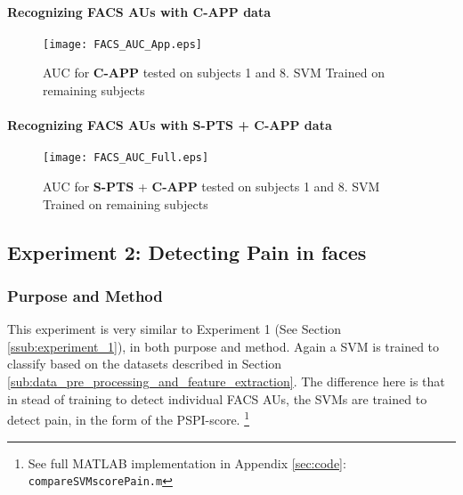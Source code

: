 \documentclass[Main]{subfiles}
\begin{document}

			\paragraph{Recognizing FACS AUs with \textbf{C-APP} data} %
				\label{par:recognizing_facs_aus_with_c_app_data}
				\vspace{-2mm} 
				\begin{figure}[H]
					\begin{center}
						\texttt{[image: FACS\_AUC\_App.eps]}
					\end{center}
					\caption{
						AUC for \textbf{C-APP} tested on subjects 1 and 8.
						SVM Trained on remaining subjects
						}
					\label{fig:capp_auc}
				\end{figure}

			\paragraph{Recognizing FACS AUs with \textbf{S-PTS} + \textbf{C-APP} data} %
				\label{par:recognizing_facs_aus_with_s_pts_c_app_data}
				\vspace{-2mm} 
				\begin{figure}[H]
					\begin{center}
						\texttt{[image: FACS\_AUC\_Full.eps]}
					\end{center}
					\caption{
						AUC for \textbf{S-PTS} + \textbf{C-APP} tested on subjects 1 and 8.
						SVM Trained on remaining subjects
						}
					\label{fig:full_auc}
				\end{figure}
				
			
		

	\subsection{Experiment 2: Detecting Pain in faces} %
		\label{sub:experiment_2_detecting_pain_in_faces}
		\subsubsection{Purpose and Method} %
			\label{ssub:purpose_and_method_ex2}
			This experiment is very similar to Experiment 1 (See Section \ref{ssub:experiment_1}), in both purpose and method.
			Again a SVM is trained to classify based on the datasets described in Section \ref{sub:data_pre_processing_and_feature_extraction}.
			The difference here is that in stead of training to detect individual FACS AUs, the SVMs are trained to detect pain, in the form of the PSPI-score.
			\footnote{See full MATLAB implementation in Appendix \ref{sec:code}: \texttt{compareSVMscorePain.m}}
			
\end{document}

